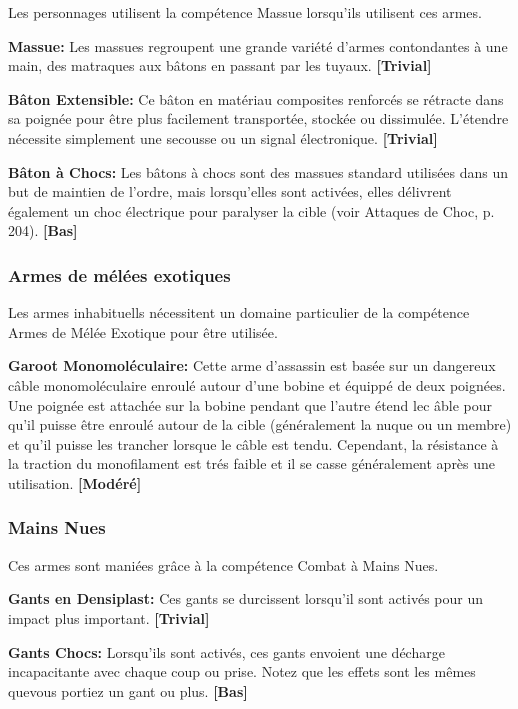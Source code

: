 Les personnages  utilisent la compétence Massue lorsqu'ils utilisent ces armes. 

\textbf{Massue:} Les massues regroupent une grande variété d'armes contondantes à une main, des matraques aux bâtons en passant par les tuyaux. \textbf{[Trivial]} 

\textbf{Bâton Extensible:} Ce bâton en matériau composites renforcés se rétracte dans sa poignée pour être plus facilement transportée, stockée ou dissimulée. L'étendre nécessite simplement une secousse ou un signal électronique. \textbf{[Trivial]} 

\textbf{Bâton à Chocs:} Les bâtons à chocs sont des massues standard utilisées dans un but de maintien de l'ordre, mais lorsqu'elles sont activées, elles délivrent également un choc électrique pour paralyser la cible (voir Attaques de Choc, p. 204). \textbf{[Bas]} 

\subsubsection{Armes de mélées exotiques} 

Les armes inhabituells nécessitent un domaine particulier de la compétence Armes de Mélée Exotique pour être utilisée. 

\textbf{Garoot Monomoléculaire:} Cette arme d'assassin est basée sur un dangereux câble monomoléculaire enroulé autour d'une bobine et équippé de deux poignées. Une poignée est attachée sur la bobine pendant que l'autre étend lec âble pour qu'il puisse être enroulé autour de la cible (généralement la nuque ou un membre) et qu'il puisse les trancher lorsque le câble est tendu. Cependant, la résistance à la traction du monofilament est trés faible et il se casse généralement après une utilisation. \textbf{[Modéré]} 

\subsubsection{Mains Nues} 

Ces armes sont maniées grâce à la compétence Combat à Mains Nues. 

\textbf{Gants en Densiplast:} Ces gants se durcissent lorsqu'il sont activés pour un impact plus important. \textbf{[Trivial]} 

\textbf{Gants Chocs:} Lorsqu'ils sont activés, ces gants envoient une décharge incapacitante avec chaque coup ou prise. Notez que les effets sont les mêmes quevous portiez un gant ou plus. \textbf{[Bas]} 







